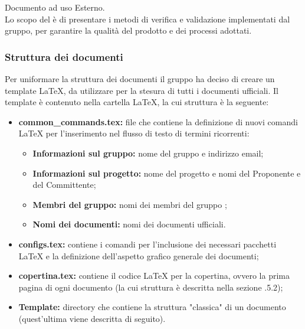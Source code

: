         Documento ad uso Esterno.\\
        Lo scopo del \textit{\PdQ{}} è di presentare i metodi di verifica e validazione implementati dal gruppo, per garantire la qualità del prodotto e dei processi adottati.

    \subsubsection{Struttura dei documenti}
        Per uniformare la struttura dei documenti il gruppo ha deciso di creare un template \LaTeX{}, da utilizzare per la stesura di tutti i documenti ufficiali. Il template è contenuto nella cartella \LaTeX{}, la cui struttura è la seguente:
        \begin{itemize}
          \item \textbf{common\_commands.tex:} file che contiene la definizione di nuovi comandi \LaTeX{} per l'inserimento nel flusso di testo di termini ricorrenti:
            \begin{itemize}
              \item \textbf{Informazioni sul gruppo:} nome del gruppo e indirizzo email;
              \item \textbf{Informazioni sul progetto:} nome del progetto e nomi del Proponente e del Committente;
              \item \textbf{Membri del gruppo:} nomi dei membri del gruppo \Gruppo;
              \item \textbf{Nomi dei documenti:} nomi dei documenti ufficiali.
            \end{itemize}
          \item \textbf{configs.tex:} contiene i comandi per l'inclusione dei necessari pacchetti \LaTeX{} e la definizione dell'aspetto grafico generale dei documenti;
          \item \textbf{copertina.tex:} contiene il codice \LaTeX{} per la copertina, ovvero la prima pagina di ogni documento (la cui struttura è descritta nella sezione .5.2);
          \item \textbf{Template:} directory che contiene la struttura "classica" di un documento (quest'ultima viene descritta di seguito).
        \end{itemize}
